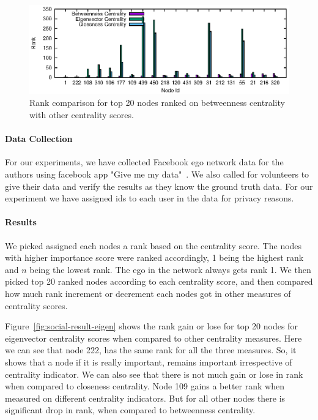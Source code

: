 \begin{figure}[ht]
    \centering
    \includegraphics[width=1\textwidth]{figures/social-result_betweenness.eps}
    \caption{Rank comparison for top 20 nodes ranked on betweenness centrality with other centrality scores.}
    \label{fig:social-result-betweenness}
\end{figure}

\paragraph{Data Collection}
For our experiments, we have collected Facebook ego network data for
the authors using facebook app "Give me my data"~\cite{givememydata}.
We also called for volunteers to give their data and verify the
results as they know the ground truth data.  For our experiment we
have assigned ids to each user in the data for privacy reasons. 

\paragraph{Results}
We picked assigned each nodes a rank based on the centrality score.
The nodes with higher importance score were ranked accordingly, 1
being the highest rank and $n$ being the lowest rank.  The ego in the
network always gets rank 1.  We then picked top 20 ranked nodes
according to each centrality score, and then compared how much rank
increment or decrement each nodes got in other measures of centrality
scores.

Figure~\ref{fig:social-result-eigen} shows the rank gain or lose for
top 20 nodes for eigenvector centrality scores when compared to other
centrality measures.  Here we can see that node 222, has the same rank
for all the three measures.  So, it shows that a node if it is really
important, remains important irrespective of centrality indicator.  We
can also see that there is not much gain or lose in rank when compared
to closeness centrality.  Node 109 gains a better rank when measured
on different centrality indicators.  But for all other nodes there is
significant drop in rank, when compared to betweenness centrality.


